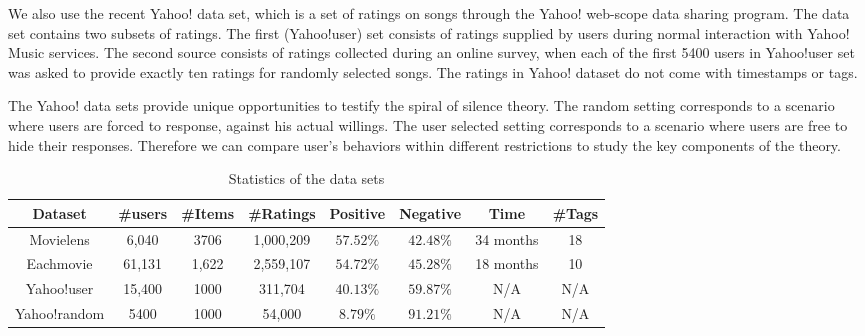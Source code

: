 \documentclass[sigconf]{acmart}
\begin{document}
We also use the recent Yahoo! data set, which is a set of ratings on songs through the Yahoo! web-scope data sharing program. The data set contains two subsets of ratings. The first (Yahoo!user) set consists of ratings supplied by users during normal interaction with Yahoo! Music services. The second source consists of ratings collected during an online survey, when each of the first 5400 users in Yahoo!user set was asked to provide exactly ten ratings for randomly selected songs. The ratings in Yahoo! dataset do not come with timestamps or tags.

The Yahoo! data sets provide unique opportunities to testify the spiral of silence theory.  The random setting corresponds to a scenario where users are forced to response, against his actual willings. The user selected setting corresponds to a scenario where users are free to hide their responses. Therefore we can compare user's behaviors within different restrictions to study the key components of the theory.
\begin{table}[htbp]
\centering
\caption{Statistics of the data sets}\label{tab:statistics}
\begin{tabular}{|c|c|c|c|c|c|c|c|}
\hline
Dataset &\#users & \#Items & \#Ratings & Positive  & Negative & Time & \#Tags\\\hline\hline
Movielens & 6,040 & 3706 & 1,000,209 & $57.52\%$ &$42.48\%$ & 34 months&18 \\\hline
Eachmovie & 61,131 & 1,622 & 2,559,107 & $54.72\%$ & $45.28\%$ &18 months &10 \\\hline
Yahoo!user & 15,400 & 1000 & 311,704 & $40.13\%$ & $59.87\%$ & N/A & N/A\\\hline
Yahoo!random & 5400 &  1000 & 54,000 & $8.79\%$& $91.21\%$ &N/A & N/A\\
\hline
\end{tabular}
\end{table}
\end{document}
